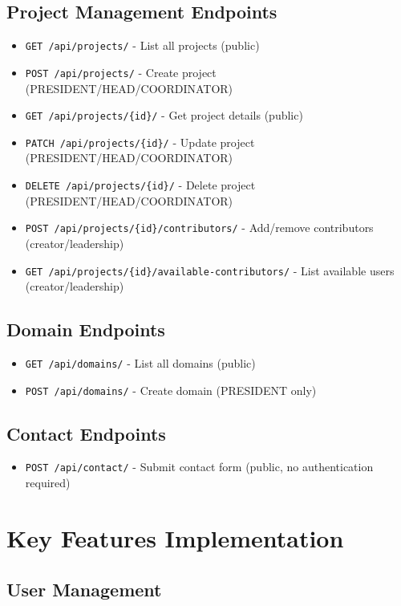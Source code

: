 \documentclass[11pt,a4paper]{article}
\begin{document}
\subsection{Project Management Endpoints}
\begin{itemize}[leftmargin=*]
    \item \texttt{GET /api/projects/} - List all projects (public)
    \item \texttt{POST /api/projects/} - Create project (PRESIDENT/HEAD/COORDINATOR)
    \item \texttt{GET /api/projects/\{id\}/} - Get project details (public)
    \item \texttt{PATCH /api/projects/\{id\}/} - Update project (PRESIDENT/HEAD/COORDINATOR)
    \item \texttt{DELETE /api/projects/\{id\}/} - Delete project (PRESIDENT/HEAD/COORDINATOR)
    \item \texttt{POST /api/projects/\{id\}/contributors/} - Add/remove contributors (creator/leadership)
    \item \texttt{GET /api/projects/\{id\}/available-contributors/} - List available users (creator/leadership)
\end{itemize}

\subsection{Domain Endpoints}
\begin{itemize}[leftmargin=*]
    \item \texttt{GET /api/domains/} - List all domains (public)
    \item \texttt{POST /api/domains/} - Create domain (PRESIDENT only)
\end{itemize}

\subsection{Contact Endpoints}
\begin{itemize}[leftmargin=*]
    \item \texttt{POST /api/contact/} - Submit contact form (public, no authentication required)
\end{itemize}

\section{Key Features Implementation}

\subsection{User Management}
\end{document}
